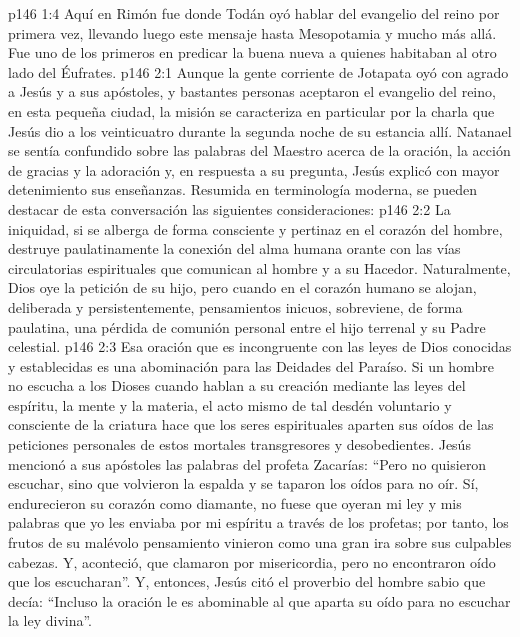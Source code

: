 \vs p146 1:4 \pc Aquí en Rimón fue donde Todán oyó hablar del evangelio del reino por primera vez, llevando luego este mensaje hasta Mesopotamia y mucho más allá. Fue uno de los primeros en predicar la buena nueva a quienes habitaban al otro lado del Éufrates.
\vs p146 2:1 Aunque la gente corriente de Jotapata oyó con agrado a Jesús y a sus apóstoles, y bastantes personas aceptaron el evangelio del reino, en esta pequeña ciudad, la misión se caracteriza en particular por la charla que Jesús dio a los veinticuatro durante la segunda noche de su estancia allí. Natanael se sentía confundido sobre las palabras del Maestro acerca de la oración, la acción de gracias y la adoración y, en respuesta a su pregunta, Jesús explicó con mayor detenimiento sus enseñanzas. Resumida en terminología moderna, se pueden destacar de esta conversación las siguientes consideraciones:
\vs p146 2:2 La iniquidad, si se alberga de forma consciente y pertinaz en el corazón del hombre, destruye paulatinamente la conexión del alma humana orante con las vías circulatorias espirituales que comunican al hombre y a su Hacedor. Naturalmente, Dios oye la petición de su hijo, pero cuando en el corazón humano se alojan, deliberada y persistentemente, pensamientos inicuos, sobreviene, de forma paulatina, una pérdida de comunión personal entre el hijo terrenal y su Padre celestial.
\vs p146 2:3 Esa oración que es incongruente con las leyes de Dios conocidas y establecidas es una abominación para las Deidades del Paraíso. Si un hombre no escucha a los Dioses cuando hablan a su creación mediante las leyes del espíritu, la mente y la materia, el acto mismo de tal desdén voluntario y consciente de la criatura hace que los seres espirituales aparten sus oídos de las peticiones personales de estos mortales transgresores y desobedientes. Jesús mencionó a sus apóstoles las palabras del profeta Zacarías: “Pero no quisieron escuchar, sino que volvieron la espalda y se taparon los oídos para no oír. Sí, endurecieron su corazón como diamante, no fuese que oyeran mi ley y mis palabras que yo les enviaba por mi espíritu a través de los profetas; por tanto, los frutos de su malévolo pensamiento vinieron como una gran ira sobre sus culpables cabezas. Y, aconteció, que clamaron por misericordia, pero no encontraron oído que los escucharan”. Y, entonces, Jesús citó el proverbio del hombre sabio que decía: “Incluso la oración le es abominable al que aparta su oído para no escuchar la ley divina”.
